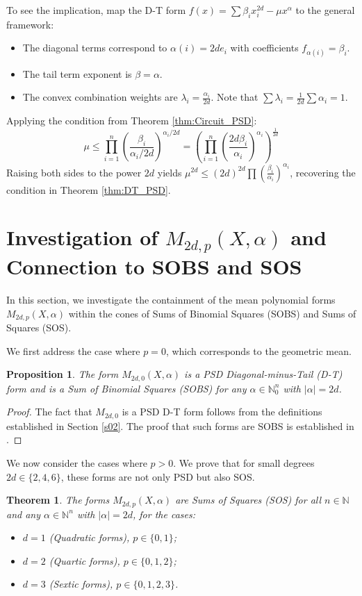 \documentclass{article}
\newtheorem{theorem}{Theorem}
\newtheorem{proposition}{Proposition}
\begin{document}
To see the implication, map the D-T form $f(x) = \sum \beta_i x_i^{2d} - \mu x^{\alpha}$ to the general framework:
\begin{itemize}
    \item The diagonal terms correspond to $\alpha(i) = 2d e_i$ with coefficients $f_{\alpha(i)} = \beta_i$.
    \item The tail term exponent is $\beta = \alpha$.
    \item The convex combination weights are $\lambda_i = \frac{\alpha_i}{2d}$. 
    Note that $\sum \lambda_i = \frac{1}{2d} \sum \alpha_i = 1$.
\end{itemize}
Applying the condition from Theorem \ref{thm:Circuit_PSD}:
\[
   \mu \leq \prod_{i=1}^n \left( \frac{\beta_i}{\alpha_i/2d} \right)^{\alpha_i/2d} = \left( \prod_{i=1}^n \left( \frac{2d \beta_i}{\alpha_i} \right)^{\alpha_i} \right)^{\frac{1}{2d}}
\]
Raising both sides to the power $2d$ yields $\mu^{2d} \leq (2d)^{2d} \prod (\frac{\beta_i}{\alpha_i})^{\alpha_i}$, 
recovering the condition in Theorem \ref{thm:DT_PSD}.

\section{Investigation of $M_{2d, p}(X, \alpha)$ and Connection to SOBS and SOS}
\label{s04}

In this section, we investigate the containment of the mean polynomial forms $M_{2d,p}(X, \alpha)$ within the 
cones of Sums of Binomial Squares (SOBS) and Sums of Squares (SOS).

We first address the case where $p=0$, which corresponds to the geometric mean.

\begin{proposition}\label{prop:M_2d_0_SOBS}
The form $M_{2d,0}(X, \alpha)$ is a PSD Diagonal-minus-Tail (D-T) form and is a Sum of Binomial Squares (SOBS) 
for any $\alpha \in \mathbb{N}_0^n$ with $|\alpha|=2d$.
\end{proposition}

\begin{proof}
The fact that $M_{2d,0}$ is a PSD D-T form follows from the definitions established in Section \ref{s02}. 
The proof that such forms are SOBS is established in \cite{GM01}.
\end{proof}

We now consider the cases where $p > 0$. We prove that for small degrees $2d \in \{2, 4, 6\}$, these forms are not 
only PSD but also SOS.

\begin{theorem}\label{thm:M_2d_p_SOS}
The forms $M_{2d,p}(X, \alpha)$ are Sums of Squares (SOS) for all $n \in \mathbb{N}$ and any $\alpha \in \mathbb{N}^n$ 
with $|\alpha|=2d$, for the cases:
\begin{itemize}
    \item $d=1$ (Quadratic forms), $p \in \{0, 1\}$;
    \item $d=2$ (Quartic forms), $p \in \{0, 1, 2\}$;
    \item $d=3$ (Sextic forms), $p \in \{0, 1, 2, 3\}$.
\end{itemize}
\end{theorem}
\end{document}

